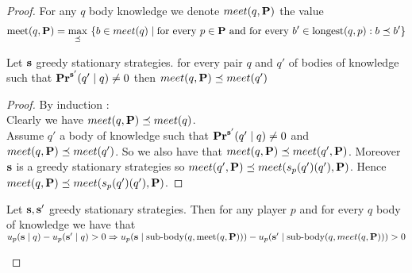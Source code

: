 \begin{proof} 
For any $q$ body knowledge we denote
	$meet(q,\mathbf{P})$ the value $$\text{\rm meet}(q,\mathbf{P})  =  {\displaystyle \max_{\preceq} \ \{b \in meet(q) \mid \text{for every } p\in \mathbf{P} \text{ and for every } b' \in {\text{\rm longest}}(q,p): b \preceq b'\}}$$
	
\begin{mylem}
	\label{lem-meet}
	Let $\mathbf{s}$ greedy stationary strategies. for every pair $q$ and $q'$ of bodies of knowledge such that $\mathbf{Pr}^{\mathbf{s}'}(q' \mid q) \neq 0$ then $meet(q,\mathbf{P}) \preceq meet(q')$
\end{mylem}	
\begin{proof}
By induction : 
\\Clearly we have $meet(q,\mathbf{P}) \preceq meet(q)$.
\\Assume $q'$ a body of knowledge such that $\mathbf{Pr}^{\mathbf{s}'}(q' \mid q) \neq 0$ and $meet(q,\mathbf{P}) \preceq meet(q')$. So we also have that $meet(q,\mathbf{P}) \preceq meet(q',\mathbf{P})$. Moreover $\mathbf{s}$ is a greedy stationary strategies so $meet(q',\mathbf{P}) \preceq meet(s_p(q')(q'),\mathbf{P})$. Hence $meet(q,\mathbf{P}) \preceq meet(s_p(q')(q'),\mathbf{P})$.

\end{proof}
	
\begin{mylem}
	\label{lemsup}
	Let $\mathbf{s}, \mathbf{s}'$ greedy stationary strategies. Then for any player $p$ and for every $q$ body of knowledge we have that $u_p(\mathbf{s} \mid q) - u_p(\mathbf{s}' \mid q) > 0 \Rightarrow u_p(\mathbf{s} \mid {\text{\rm sub-body}}(q,\text{\rm meet}(q,\mathbf{P}))) - u_p(\mathbf{s}' \mid {\text{\rm sub-body}}(q,meet(q,\mathbf{P}))) > 0$
\end{mylem}


\end{proof}
